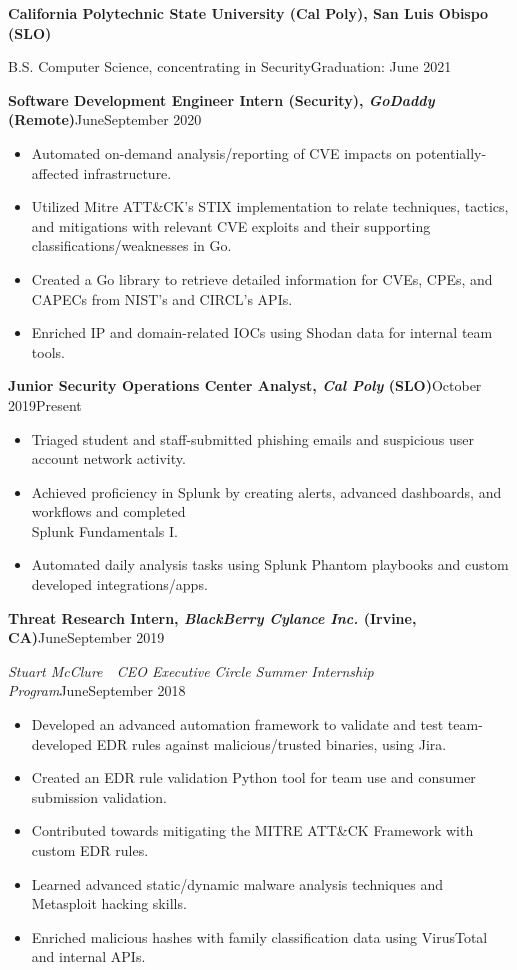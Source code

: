 \documentclass[12pt]{article}
\renewcommand\Large{\fontsize{15.5}{18}}
\newcommand{\resumesection}[1]{
  \vspace{1em}
  \noindent\Large{\textbf{#1}}\hfill\normalsize
}
\newcommand{\resumelistitem}[1]{
  \item{\fontsize{11.5}{18}#1}
}
\newcommand{\resumejobtitle}[5]{
  \vspace{0.5em}
  \noindent\normalsize{\textbf{#1, \textit{#2} (#3)}}\hfill\small{#4\textemdash#5}
}
\begin{document}
  \pagestyle{resumeheader}

  \resumesection{Education}

    \indent\textbf{California Polytechnic State University (Cal Poly), San Luis Obispo (SLO)}

    \indent\indent B.S. Computer Science, concentrating in Security\hfill Graduation: June 2021

  \resumesection{Work Experience}

    \resumejobtitle{Software Development Engineer Intern (Security)}{GoDaddy}{Remote}{June}{September 2020}

    \begin{itemize}
      \setlength{\itemsep}{0.15pt}
      \resumelistitem{Automated on-demand analysis/reporting of CVE impacts on potentially-affected infrastructure.}
      \resumelistitem{Utilized Mitre ATT\&CK's STIX implementation to relate
        techniques, tactics, and mitigations with relevant CVE
        exploits and their supporting classifications/weaknesses in Go.}
      \resumelistitem{Created a Go library to retrieve detailed information for
        CVEs, CPEs, and CAPECs from NIST's and CIRCL's APIs.}
      \resumelistitem{Enriched IP and domain-related IOCs using Shodan data for internal team tools.}
    \end{itemize}

    \resumejobtitle{Junior Security Operations Center Analyst}{Cal Poly}{SLO}{October 2019}{Present}

    \begin{itemize}
      \setlength{\itemsep}{0.15pt}
      \resumelistitem{Triaged student and staff-submitted phishing emails and suspicious user account network activity.}
      \resumelistitem{Achieved proficiency in Splunk by creating alerts, advanced dashboards, and workflows and completed \\ Splunk Fundamentals I.}
      \resumelistitem{Automated daily analysis tasks using Splunk Phantom playbooks and custom developed integrations/apps.}
    \end{itemize}

    \resumejobtitle{Threat Research Intern}{BlackBerry Cylance Inc.}{Irvine, CA}{June}{September 2019}

    \noindent\small\textit{Stuart McClure~\textemdash~CEO Executive Circle Summer Internship Program}\hfill\normalsize{June\textemdash September 2018}

    \begin{itemize}
      \setlength{\itemsep}{0.15pt}
      \resumelistitem{Developed an advanced automation framework to validate and
        test team-developed EDR rules against malicious/trusted binaries, using Jira.}
      \resumelistitem{Created an EDR rule validation Python tool for team use and consumer submission validation.}
      \resumelistitem{Contributed towards mitigating the MITRE ATT\&CK Framework with custom EDR rules.}
      \resumelistitem{Learned advanced static/dynamic malware analysis techniques and Metasploit hacking skills.}
      \resumelistitem{Enriched malicious hashes with family classification data using VirusTotal and internal APIs.}
		\end{itemize}
\end{document}
